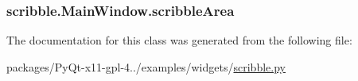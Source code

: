 \subsubsection[{scribble\+Area}]{\setlength{\rightskip}{0pt plus 5cm}scribble.\+Main\+Window.\+scribble\+Area}\label{classscribble_1_1MainWindow_a8403d06a7cf3e5a741329a2e76d89f2c}


The documentation for this class was generated from the following file\+:\begin{DoxyCompactItemize}
\item 
packages/\+Py\+Qt-\/x11-\/gpl-\/4../examples/widgets/\hyperlink{scribble_8py}{scribble.\+py}\end{DoxyCompactItemize}
